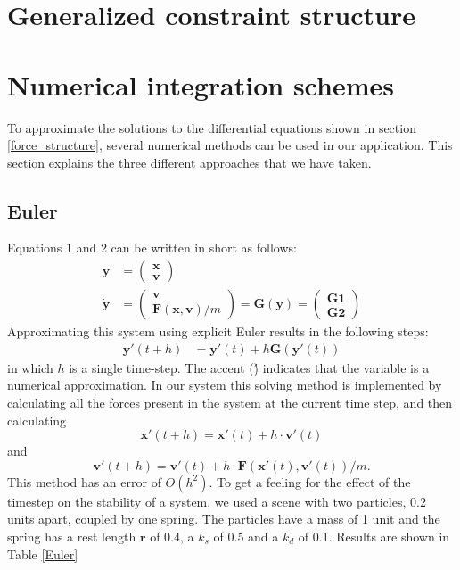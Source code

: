 \documentclass[a4paper,twoside,11pt,twocolumn]{article}
\begin{document}
\section{Generalized constraint structure}

\section{Numerical integration schemes}
\label{Numerical_schemes}
To approximate the solutions to the differential equations shown in section \ref{force_structure}, several numerical methods can be used in our application. This section explains the three different approaches that we have taken.
\subsection{Euler}
Equations 1 and 2 can be written in short as follows:
\begin{align}
	\mathbf{y} &= \begin{pmatrix}\mathbf{x}\\\mathbf{v}\end{pmatrix}\\
	\dot{\mathbf{y}} &= \begin{pmatrix}\mathbf{v}\\\mathbf{F}(\mathbf{x}, \mathbf{v})/m\end{pmatrix} = \mathbf{G}(\mathbf{y}) = \begin{pmatrix}\mathbf{G1}\\\mathbf{G2}\end{pmatrix}
\end{align}
Approximating this system using explicit Euler results in the following steps:
\begin{align}
	\mathbf{y}'(t+h) &= \mathbf{y}'(t) + h\mathbf{G}(\mathbf{y}'(t))
\end{align}
in which $h$ is a single time-step. The accent (\') indicates that the variable is a numerical approximation. In our system this solving method is implemented by calculating all the forces present in the system at the current time step, and then calculating \[\mathbf{x}'(t+h) = \mathbf{x}'(t) + h\cdot \mathbf{v}'(t)\] and \[\mathbf{v}'(t+h) = \mathbf{v}'(t) + h\cdot \mathbf{F}(\mathbf{x}'(t), \mathbf{v}'(t))/m.\] This method has an error of $O(h^2)$. 
To get a feeling for the effect of the timestep on the stability of a system, we used a scene with two particles, 0.2 units apart, coupled by one spring. The particles have a mass of 1 unit and the spring has a rest length $\mathbf{r}$ of 0.4, a $k_s$ of 0.5 and a $k_d$ of 0.1. Results are shown in Table \ref{Euler}
\end{document}
